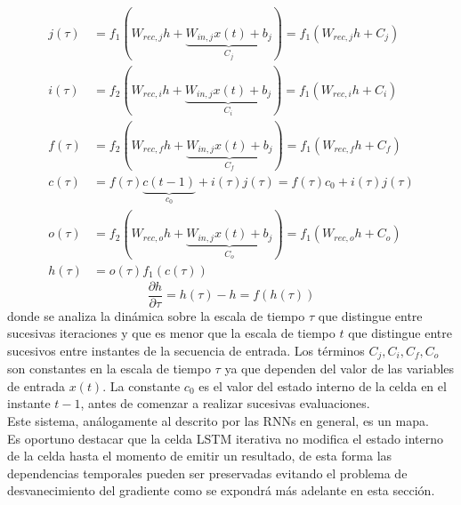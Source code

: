 \documentclass{article}
\begin{document}
	\begin{equation*}
	\begin{split}
	j(\tau) &= f_1(W_{rec, j} h + \underbrace{W_{in, j} x(t) + b_{j}}_{C_j} ) =  f_1(W_{rec, j} h + C_j)\\
	i(\tau) &= f_2(W_{rec, i} h + \underbrace{W_{in, j} x(t) + b_{j}}_{C_i} ) =  f_1(W_{rec, i} h + C_i)\\
	f(\tau) &= f_2(W_{rec, f} h + \underbrace{W_{in, j} x(t) + b_{j}}_{C_f} ) =  f_1(W_{rec, f} h + C_f)\\
	c(\tau) &= f(\tau)\underbrace{c(t-1)}_{c_0} + i(\tau)j(\tau) = f(\tau) c_0 + i(\tau)j(\tau) \\
	o(\tau)& = f_2(W_{rec, o} h + \underbrace{W_{in, j} x(t) + b_{j}}_{C_o} ) =  f_1(W_{rec, o} h + C_o)\\
	h(\tau) &= o(\tau)f_1(c(\tau))
	\end{split}
	\end{equation*}
	\begin{equation}\label{iterativeLSTMdynamics}
	\dfrac{\partial h}{\partial \tau} = h(\tau) - h = f(h(\tau))
	\end{equation}
	donde se analiza la dinámica sobre la escala de tiempo $\tau$ que distingue entre sucesivas iteraciones y que es menor que la escala de tiempo $t$ que distingue entre sucesivos entre instantes de la secuencia de entrada. Los términos $C_j, C_i, C_f, C_o$ son constantes en la escala de tiempo $\tau$ ya que dependen del valor de las variables de entrada $x(t)$. La constante $c_0$ es el valor del estado interno de la celda en el instante $t-1$, antes de comenzar a realizar sucesivas evaluaciones. \\
	Este sistema, análogamente al descrito por las RNNs en general, es un mapa\cite{21StrogatzBook}.\\
	Es oportuno destacar que la celda LSTM iterativa no modifica el estado interno de la celda hasta el momento de emitir un resultado, de esta forma las dependencias temporales pueden ser preservadas evitando el problema de desvanecimiento del gradiente como se expondrá más adelante en esta sección.
	
\end{document}
